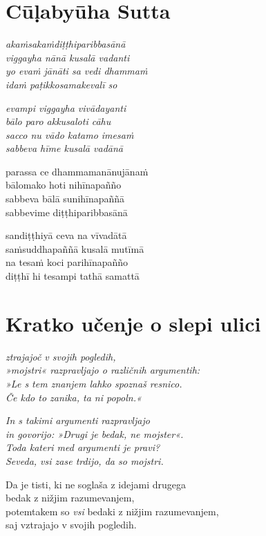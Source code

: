 

\cleartoverso
\chapter*{Cūḷabyūha Sutta}

\emph{akaṁsakaṁdiṭṭhiparibbasānā\\
viggayha nānā kusalā vadanti\\
yo evaṁ jānāti sa vedi dhammaṁ\\
idaṁ paṭikkosamakevalī so}

\emph{evampi viggayha vivādayanti\\
bālo paro akkusaloti cāhu}\\
\emph{sacco nu vādo katamo imesaṁ\\
sabbeva hīme kusalā vadānā}

parassa ce dhammamanānujānaṁ\\
bālomako hoti nihīnapañño\\
sabbeva bālā sunihīnapaññā\\
sabbevime diṭṭhiparibbasānā

sandiṭṭhiyā ceva na vīvadātā\\
saṁsuddhapaññā kusalā mutīmā\\
na tesaṁ koci parihīnapañño\\
diṭṭhī hi tesampi tathā samattā


\cleartorecto
\chapter{Kratko učenje o slepi ulici}

\emph{ztrajajoč v svojih pogledih,\\
»mojstri« razpravljajo o različnih argumentih:\\
»Le s tem znanjem lahko spoznaš resnico.\\
Če kdo to zanika, ta ni popoln.«}

\emph{In s takimi argumenti razpravljajo}\\
\emph{in govorijo: »Drugi je bedak, ne mojster«.}\\
\emph{Toda kateri med argumenti je pravi?}\\
\emph{Seveda, vsi zase trdijo, da so mojstri.}

Da je tisti, ki ne soglaša z idejami drugega\\
bedak z nižjim razumevanjem,\\
potemtakem so \emph{vsi} bedaki z nižjim razumevanjem,\\
saj vztrajajo v svojih pogledih.

